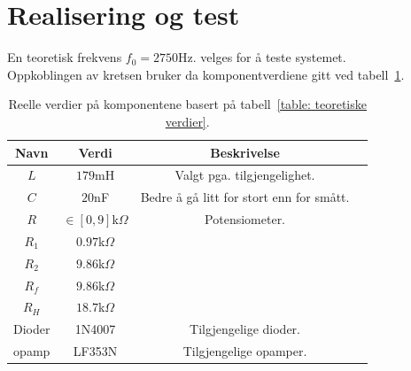 \documentclass[a4paper,11pt,norsk]{article}
\begin{document}
\section{Realisering og test}
\label{sec:realisering}
En teoretisk frekvens $f_0 = 2750$Hz. velges for å teste systemet. \\
Oppkoblingen av kretsen bruker da komponentverdiene gitt ved tabell~\ref{table: reelle verdier}.
\begin{table}[htbp]
\centering
\begin{tabular}{ |c|c|c|c| } 
\hline
\textbf{Navn} & \textbf{Verdi} & \textbf{Beskrivelse}\\
\hline
$L$ & $179$mH & Valgt pga. tilgjengelighet. \\
\hline
$C$ & $20$nF & Bedre å gå litt for stort enn for smått.
\\
\hline
$R$ & $\in[0, 9]$k$\Omega$ & Potensiometer.
\\
\hline
$R_1$ & $0.97$k$\Omega$ & 
\\
\hline
$R_2$ & $9.86$k$\Omega$ & 
\\
\hline
$R_f$ & $9.86$k$\Omega$ & 
\\
\hline
$R_H$ & $18.7$k$\Omega$ & 
\\
\hline
Dioder & 1N4007 & Tilgjengelige dioder.
\\
\hline
opamp & LF353N & Tilgjengelige opamper.
\\
\hline
\end{tabular}
\caption{Reelle verdier på komponentene basert på tabell~\ref{table: teoretiske verdier}.}
\label{table: reelle verdier}
\end{table}
\\
\end{document}
